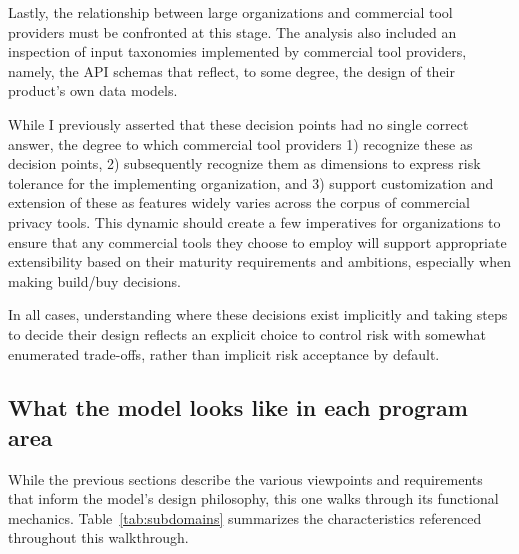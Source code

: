 \documentclass[10pt,letterpaper,twocolumn,twoside]{rho-class/rho}
\begin{document}
Lastly, the relationship between large organizations and commercial tool providers must be confronted at this stage. The analysis also included an inspection of input taxonomies implemented by commercial tool providers, namely, the API schemas that reflect, to some degree, the design of their product's own data models. 

While I previously asserted that these decision points had no single correct answer, the degree to which commercial tool providers 1) recognize these as decision points, 2) subsequently recognize them as dimensions to express risk tolerance for the implementing organization, and 3) support customization and extension of these as features widely varies across the corpus of commercial privacy tools. This dynamic should create a few imperatives for organizations to ensure that any commercial tools they choose to employ will support appropriate extensibility based on their maturity requirements and ambitions, especially when making build/buy decisions. 

In all cases, understanding where these decisions exist implicitly and taking steps to decide their design reflects an explicit choice to control risk with somewhat enumerated trade-offs, rather than implicit risk acceptance by default.

\subsection{What the model looks like in each program area}\label{sec:areas}

While the previous sections describe the various viewpoints and requirements that inform the model's design philosophy, this one walks through its functional mechanics. 
Table~\ref{tab:subdomains} summarizes the characteristics referenced throughout this walkthrough.
\end{document}
